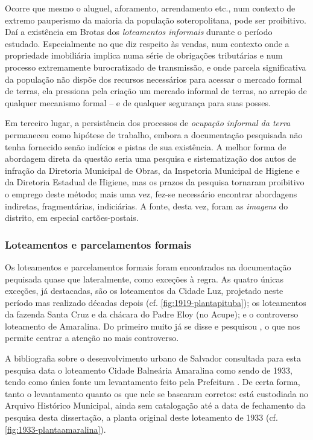 Ocorre que mesmo o aluguel, aforamento, arrendamento etc., num contexto de extremo pauperismo da maioria da população soteropolitana, pode ser proibitivo. Daí a existência em Brotas dos \textit{loteamentos informais} durante o período estudado. Especialmente no que diz respeito às vendas, num contexto onde a propriedade imobiliária implica numa série de obrigações tributárias e num processo extremamente burocratizado de transmissão, e onde parcela significativa da população não dispõe dos recursos necessários para acessar o mercado formal de terras, ela pressiona pela criação um mercado informal de terras, ao arrepio de qualquer mecanismo formal -- e de qualquer segurança para suas posses. 

Em terceiro lugar, a persistência dos processos de \textit{ocupação informal da terra} permaneceu como hipótese de trabalho, embora a documentação pesquisada não tenha fornecido senão indícios e pistas de sua existência. A melhor forma de abordagem direta da questão seria uma pesquisa e sistematização dos autos de infração da Diretoria Municipal de Obras, da Inspetoria Municipal de Higiene e da Diretoria Estadual de Higiene, mas os prazos da pesquisa tornaram proibitivo o emprego deste método; mais uma vez, fez-se necessário encontrar abordagens indiretas, fragmentárias, indiciárias. A fonte, desta vez, foram as \textit{imagens} do distrito, em especial cartões-postais.

\subsubsection{Loteamentos e parcelamentos formais}\label{subsubsec:lotparform}

Os loteamentos e parcelamentos formais foram encontrados na documentação pequisada quase que lateralmente, como exceções à regra. As quatro únicas exceções, já destacadas, são os loteamentos da Cidade Luz, projetado neste período mas realizado décadas depois (cf. \autoref{fig:1919-plantapituba}); os loteamentos da fazenda Santa Cruz e da chácara do Padre Eloy (no Acupe); e o controverso loteamento de Amaralina. Do primeiro muito já se disse e pesquisou \cite{costa1996theodoro, fernandessampaiogomes1999, salvador_loteamentos_1977, santos_theodoro_2010}, o que nos permite centrar a atenção no mais controverso.

A bibliografia sobre o desenvolvimento urbano de Salvador consultada para esta pesquisa data o loteamento Cidade Balneária Amaralina como sendo de 1933, tendo como única fonte um levantamento feito pela Prefeitura \cite{salvador_loteamentos_1977}. De certa forma, tanto o levantamento quanto os que nele se basearam corretos: está custodiada no Arquivo Histórico Municipal, ainda sem catalogação até a data de fechamento da pesquisa desta dissertação, a planta original deste loteamento de 1933 (cf. \autoref{fig:1933-plantaamaralina}). 

